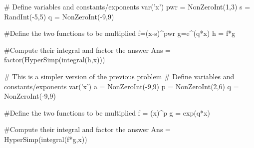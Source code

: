 







\begin{sagesilent}
# Define variables and constants/exponents
var('x')
pwr = NonZeroInt(1,3)
s = RandInt(-5,5)
q = NonZeroInt(-9,9)

#Define the two functions to be multiplied
f=(x-s)^pwr
g=e^(q*x)
h = f*g

#Compute their integral and factor the answer
Ans = factor(HyperSimp(integral(h,x)))
\end{sagesilent}



\begin{sagesilent}
# This is a simpler version of the previous problem
# Define variables and constants/exponents
var('x')
a = NonZeroInt(-9,9)
p = NonZeroInt(2,6)
q = NonZeroInt(-9,9)

#Define the two functions to be multiplied
f = (x)^p
g = exp(q*x)

#Compute their integral and factor the answer
Ans = HyperSimp(integral(f*g,x))

\end{sagesilent}



